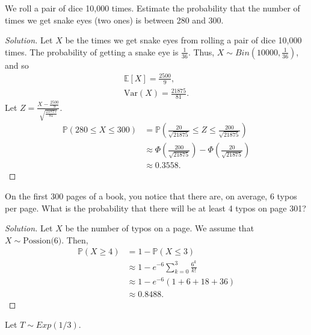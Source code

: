 \documentclass[addpoints, 11pt]{exam}
\newcommand*{\prob}{\mathds{P}}
\newcommand*{\E}{\mathds{E}}
\newenvironment{question}[1]{\smallskip\noindent\color{crimson}{\bf Question #1.}}{}
\begin{document}
\newpage

\begin{question}{3}
    We roll a pair of dice 10,000 times. Estimate the probability that the number of times we get snake eyes (two ones) is between 280 and 300.
\end{question}

\begin{proof}[Solution]
    Let $X$ be the times we get snake eyes from rolling a pair of dice 10,000 times. The probability of getting a snake eye is $\frac{1}{36}$. Thus, $X \sim Bin(10000, \frac{1}{36})$, and so
    \begin{gather*}
        \E[X] = \frac{2500}{9}, \\
        \text{Var}(X) = \frac{21875}{81}.
    \end{gather*}
    Let $Z = \frac{X - \frac{2500}{9}}{\sqrt{\frac{21875}{81}}}$.
    \begin{align*}
        \prob(280 \leq X \leq 300)
        &= \prob\left(\frac{20}{\sqrt{21875}} \leq Z \leq \frac{200}{\sqrt{21875}}\right) \\
        &\approx \Phi\left(\frac{200}{\sqrt{21875}}\right) - \Phi\left(\frac{20}{\sqrt{21875}}\right) \\
        &\approx 0.3558.
    \end{align*}
\end{proof}

\newpage

\begin{question}{4}
    On the first 300 pages of a book, you notice that there are, on average, 6 typos per page. What is the probability that there will be at least 4 typos on page 301?
\end{question}

\begin{proof}[Solution]
    Let $X$ be the number of typos on a page. We assume that $X \sim \text{Possion(6)}$. Then, 
    \begin{align*}
        \prob(X \geq 4)
        &= 1 - \prob(X \leq 3) \\
        &\approx 1 - e^{-6}\sum_{k = 0}^{3} \frac{6^k}{k!} \\
        &\approx 1 - e^{-6}\left(1 + 6 + 18 + 36\right) \\
        &\approx 0.8488.
    \end{align*}
\end{proof}

\newpage

\begin{question}{5}
     Let $T \sim Exp(1/3)$.
\end{question}
\end{document}
